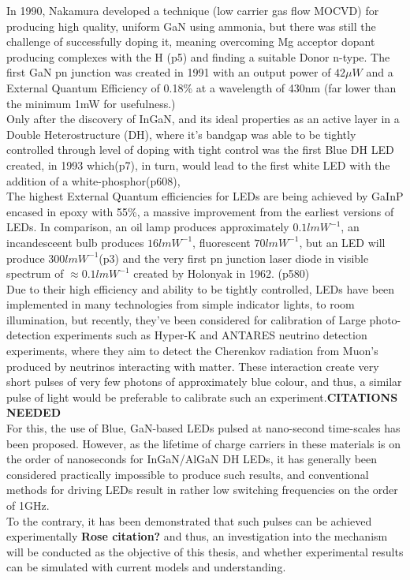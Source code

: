 \documentclass[titlepage]{article}
\begin{document}
In 1990, Nakamura developed a technique (low carrier gas flow MOCVD) for producing high quality, uniform GaN using ammonia, but there was still the challenge of successfully doping it, meaning overcoming Mg acceptor dopant producing complexes with the H \cite{Nakamura}(p5) and finding a suitable Donor n-type. The first GaN pn junction was created in 1991 with an output power of $42\mu W$ and a External Quantum Efficiency of 0.18\% at a wavelength of 430nm (far lower than the minimum 1mW for usefulness.) \\
Only after the discovery of InGaN, and its ideal properties as an active layer in a Double Heterostructure (DH), where it's bandgap was able to be tightly controlled through level of doping with tight control was the first Blue DH LED created, in 1993 which\cite{Nakamura}(p7), in turn, would lead to the first white LED with the addition of a white-phosphor\cite{Sze}(p608), \\The highest External Quantum efficiencies for LEDs are being achieved by GaInP encased in epoxy with 55\%,\cite{EQE} a massive improvement from the earliest versions of LEDs. In comparison, an oil lamp produces approximately $0.1lmW^{-1}$, an incandesceent bulb produces  $16lmW^{-1}$, fluorescent  $70lmW^{-1}$, but an LED will produce  $300lmW^{-1}$\cite{Nakamura}(p3) and the very first pn junction laser diode in visible spectrum of  $\approx 0.1lmW^{-1}$ created by Holonyak in 1962. \cite{Kittel}(p580)\\
Due to their high efficiency and ability to be tightly controlled, LEDs have been implemented in many technologies from simple indicator lights, to room illumination, but recently, they've been considered for calibration of Large photo-detection experiments such as Hyper-K and ANTARES neutrino detection experiments, where they aim to detect the Cherenkov radiation from Muon's produced by neutrinos interacting with matter. These interaction create very short pulses of very few photons of approximately blue colour, and thus, a similar pulse of light would be preferable to calibrate such an experiment.\textbf{CITATIONS NEEDED} \\
For this, the use of Blue, GaN-based LEDs pulsed at nano-second time-scales has been proposed. However, as the lifetime of charge carriers in these materials is on the order of nanoseconds for InGaN/AlGaN DH LEDs\cite{Brailovsky}, it has generally been considered practically impossible to produce such results, and conventional methods for driving LEDs result in rather low switching frequencies on the order of 1GHz. \\ To the contrary, it has been demonstrated that such pulses can be achieved experimentally \textbf{Rose citation?} and thus, an investigation into the mechanism will be conducted as the objective of this thesis, and whether experimental results can be simulated with current models and understanding.
\end{document}
